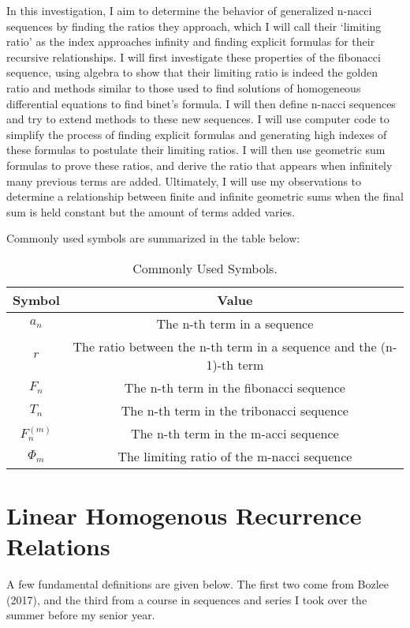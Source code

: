 \documentclass[11pt]{article}
\begin{document}
In this investigation, I aim to determine the behavior of generalized n-nacci sequences by finding the ratios they approach, which I will call their ‘limiting ratio’ as the index approaches infinity and finding explicit formulas for their recursive relationships. I will first investigate these properties of the fibonacci sequence, using algebra to show that their limiting ratio is indeed the golden ratio and methods similar to those used to find solutions of homogeneous differential equations to find binet’s formula. I will then define n-nacci sequences and try to extend methods to these new sequences. I will use computer code to simplify the process of finding explicit formulas and generating high indexes of these formulas to postulate their limiting ratios. I will then use geometric sum formulas to prove these ratios, and derive the ratio that appears when infinitely many previous terms are added. Ultimately, I will use my observations to determine a relationship between finite and infinite geometric sums when the final sum is held constant but the amount of terms added varies. 

\noindent Commonly used symbols are summarized in the table below:

\begin{table}[h]
\begin{center}
    \begin{tabular}{ |c|c| } 
    \hline
    \textbf{Symbol} & \textbf{Value} \\
    \hline
    $a_n$ & The n-th term in a sequence \\ 
    \hline
    $r$ & The ratio between the n-th term in a sequence and the (n-1)-th term \\ 
    \hline
    $F_n$ & The n-th term in the fibonacci sequence \\
    \hline
    $T_n$ & The n-th term in the tribonacci sequence \\
    \hline
    $F^{(m)}_n$ & The n-th term in the m-acci sequence \\ 
    \hline
    $\Phi_m$ & The limiting ratio of the m-nacci sequence \\
    \hline
    \end{tabular}
    \caption{Commonly Used Symbols.}
\label{table:1}
\end{center}
\end{table}

\section{Linear Homogenous Recurrence Relations}
A few fundamental definitions are given below. The first two come from Bozlee (2017), and the third from a course in sequences and series I took over the summer before my senior year.
\end{document}
